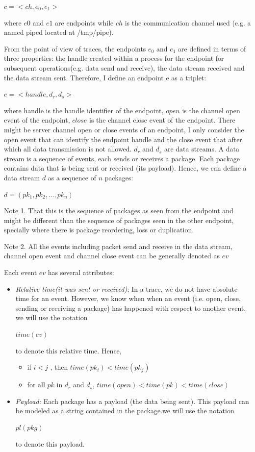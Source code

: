 $c =<ch, e_0, e_1>$

where $e0$ and $e1$ are endpoints while $ch$ is the communication channel used (e.g. a named piped located at /tmp/pipe).

From the point of view of traces, the endpoints $e_0$ and $e_1$ are defined in terms of three properties: the handle created within a process for the endpoint for subsequent operations(e.g. data send and receive), the data stream received and the data stream sent. Therefore, I define an endpoint e as a triplet:

$ e =<handle,  d_r, d_s>$

where handle is the handle identifier of the endpoint, $open$ is the channel open event of the endpoint, $close$ is the channel close event of the endpoint. There might be server channel open or close events of an endpoint, I only consider the open event that can identify the endpoint handle and the close event that after which all data transmission is not allowed. $d_r$ and $d_s$ are data streams. A data stream is a sequence of events, each sends or receives a package. Each package contains data that is being sent or received (its payload). Hence, we can define a data stream $d$ as a sequence of $n$ packages:

$ d = (pk_1, pk_2, ..., pk_n)$ 

Note 1. That this is the sequence of packages as seen from the endpoint and might be different than the sequence of packages seen in the other endpoint, specially where there is package reordering, loss or duplication.

Note 2. All the events including packet send and receive in the data stream, channel open event and channel close event can be generally denoted as $ev$

Each event $ev$ has several attributes:
\begin{itemize}
\item \textit{Relative time(it was sent or received):} In a trace, we do not have absolute time for an event. However, we know when when an event (i.e. open, close, sending or receiving a package) has happened with respect to another event. we will use the notation 

$time(ev)$

to denote this relative time. Hence, 
\begin{itemize}
\item  if  $i < j $ , then  $time(pk_i) < time(pk_j)$

\item  for all $pk$ in $d_r$ and $d_s$, $time(open) < time(pk) < time(close)$
\end{itemize}

\item \textit{Payload:} Each package has a payload (the data being sent). This payload can be modeled as a string contained in the package.we will use the notation 

$pl(pkg)$ 

to denote this payload. 

\end{itemize}


